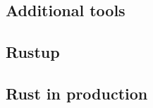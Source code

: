 \documentclass[%
final,
xcolor = table,
usenames,
dvipsnames,
table,
aspectratio = 169]{beamer}
\begin{document}
\subsection{Additional tools}


\subsection{Rustup}


\subsection{Rust in production}








% 


\end{document}
